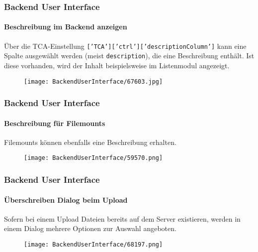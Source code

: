\begin{frame}[fragile]
	\frametitle{Backend User Interface}
	\framesubtitle{Beschreibung im Backend anzeigen}

	Über die TCA-Einstellung \texttt{['TCA']['ctrl']['descriptionColumn']} kann eine Spalte ausgewählt werden
	(meist \texttt{description}), die eine Beschreibung enthält.
	Ist diese vorhanden, wird der Inhalt beispielsweise im Listenmodul angezeigt.

	\begin{figure}
		\texttt{[image: BackendUserInterface/67603.jpg]}
	\end{figure}

\end{frame}

\begin{frame}[fragile]
	\frametitle{Backend User Interface}
	\framesubtitle{Beschreibung für Filemounts}

	Filemounts können ebenfalls eine Beschreibung erhalten.

	\begin{figure}
		\texttt{[image: BackendUserInterface/59570.png]}
	\end{figure}

\end{frame}

\begin{frame}[fragile]
	\frametitle{Backend User Interface}
	\framesubtitle{Überschreiben Dialog beim Upload}

	Sofern bei einem Upload Dateien bereits auf dem Server existieren,
	werden in einem Dialog mehrere Optionen zur Auswahl angeboten.

	\begin{figure}
		\texttt{[image: BackendUserInterface/68197.png]}
	\end{figure}

\end{frame}


